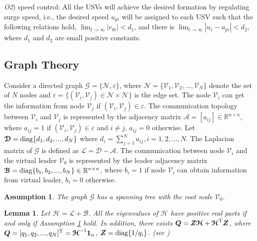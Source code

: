 \documentclass[conference,letterpaper,10.5pt]{IEEEtran}
\newtheorem{lemma}{Lemma}
\newtheorem{assumption}{Assumption}
\begin{document}
\emph{O2}) speed control: All the USVs will achieve the desired formation by regulating surge speed, i.e., the desired speed $u_{pi}$ will be assigned to each USV such that the following relations hold, $\lim_{t\to \infty}\left|e_{\theta i}\right|<d_1$, and there is $\lim_{t\to \infty}\left|u_{i}-u_{pi}\right|<d_2$, where $d_1$ and $d_2$ are small positive constants. 

\subsection{Graph Theory}

Consider a directed graph $\mathcal{G}=\{\mathcal{N},\varepsilon\}$, where $\mathcal{N}=\{\mathcal{V}_1,\mathcal{V}_2,...,\mathcal{V}_N\}$ denote the set of $N$ nodes and $\varepsilon=\{(\mathcal{V}_i,\mathcal{V}_j)\in \mathcal{N}\times \mathcal{N}\}$ is the edge set. The node $\mathcal{V}_i$ can get the information from node $\mathcal{V}_j$ if $(\mathcal{V}_i,\mathcal{V}_j)\in \varepsilon$. The communication topology between $\mathcal{V}_i$ and $\mathcal{V}_j$ is represented by the adjacency matrix $\boldsymbol{\mathcal{A}}=[a_{ij}]\in \mathbb{R}^{n\times n}$, where $a_{ij}=1$ if $(\mathcal{V}_i,\mathcal{V}_j)\in \varepsilon$ and $i\neq j$, $a_{ij}=0$ otherwise. Let $\boldsymbol{\mathcal{D}}={\rm diag}\{d_1,d_2,...,d_N\}$ where $d_i=\sum^N_{j=1}a_{ij},i=1,2,...,N$. The Laplacian matrix of $\mathcal{G}$ is defined as $\boldsymbol{\mathcal{L}}=\boldsymbol{\mathcal{D}}-\boldsymbol{\mathcal{A}}$. The communication between node $\mathcal{V}_i$ and the virtual leader $\mathcal{V}_0$ is represented by the leader adjacency matrix $\boldsymbol{\mathcal{B}}={\rm diag}\{b_1,b_2,...,b_N\}\in \mathbb{R}^{n\times n}$, where $b_i=1$ if node $\mathcal{V}_i$ can obtain information from virtual leader, $b_i=0$ otherwise. 

\begin{assumption}\label{assumption}
	The graph $\mathcal{G}$ has a spanning tree with the root node $\mathcal{V}_0$.
\end{assumption}

\begin{lemma}\label{lemma}
	Let $\boldsymbol{\mathcal{H}}=\boldsymbol{\mathcal{L}}+\boldsymbol{\mathcal{B}}$. All the eigenvalues of $\boldsymbol{\mathcal{H}}$ have positive real parts if and only if Assumption \ref{assumption} hold. In addition, there exists $\bm{Q}=\bm{Z}\boldsymbol{\mathcal{H}}+\boldsymbol{\mathcal{H}}^{\rm T}\bm{Z}$, where $\bm{Q}=[q_1,q_2,...,q_N]^{\rm T}=\boldsymbol{\mathcal{H}}^{-1}\bm{1}_n$, $\bm{Z}={\rm diag}\{1/q_i\}$. {\rm (see \cite{bib14,bib15})}
\end{lemma} 
\end{document}
